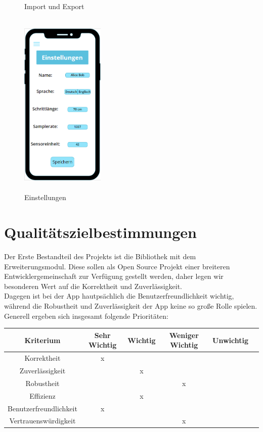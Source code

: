 \documentclass[a4paper,12pt]{article}
\begin{document}
\begin{figure}[ht!]
\begin{minipage}{0.4\textwidth}
		\caption{Import und Export}
	\end{minipage}
	\hfill
	\begin{minipage}{0.4\textwidth}
		\includegraphics[width=4cm,height=9cm]{./Benutzeroberflaeche/Settings.png}
		\caption{Einstellungen}
	\end{minipage}
\end{figure}
\newpage
\clearpage

\section{Qualitätszielbestimmungen}
Der Erste Bestandteil des Projekts ist die Bibliothek mit dem Erweiterungsmodul. Diese sollen als Open Source Projekt einer breiteren Entwicklergemeinschaft zur Verfügung gestellt werden, daher legen wir besonderen Wert auf die Korrektheit und Zuverlässigkeit.\\
Dagegen ist bei der App hautpsächlich die Benutzerfreundlichkeit wichtig, während die Robustheit und Zuverlässigkeit der App keine so große Rolle spielen. Generell ergeben sich insgesamt folgende Prioritäten:
\begin{tabular}[t]{|c|c|c|c|c|c|}
  \hline
  \textbf{Kriterium} & \textbf{Sehr Wichtig} & \textbf{Wichtig} & \textbf{Weniger Wichtig} & \textbf{Unwichtig}\\
  \hline
  \hline
  Korrektheit & x & & &\\ %
  \hline
  Zuverlässigkeit & & x & &\\ %
  \hline
  Robustheit & & & x &\\  %
  \hline
  Effizienz & & x & &\\ %
  \hline
  Benutzerfreundlichkeit & x & & &\\ %
  \hline
  Vertrauenswürdigkeit & & & x &\\ %
  \hline

\end{tabular}
\end{document}
